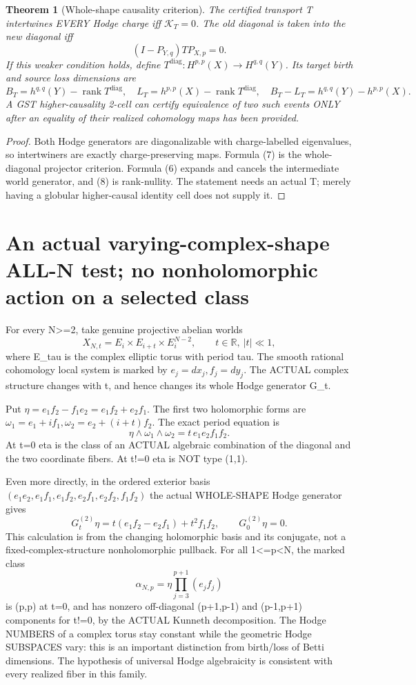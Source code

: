 \documentclass[11pt]{article}
\newtheorem{theorem}{Theorem}
\begin{document}
\begin{theorem}[Whole-shape causality criterion]
The certified transport T intertwines EVERY Hodge
charge iff \(\mathcal K_T=0\). The old diagonal is
taken into the new diagonal iff
\[
 \boxed{(I-P_{Y,q})T P_{X,p}=0.}                   \tag{7}
\]
If this weaker condition holds, define
\(T^{\mathrm{diag}}:H^{p,p}(X)\to H^{q,q}(Y)\).
Its target birth and source loss dimensions are
\[
 \boxed{
 B_T=h^{q,q}(Y)-\operatorname{rank}T^{\mathrm{diag}},
 \quad L_T=h^{p,p}(X)-\operatorname{rank}T^{\mathrm{diag}},
 \quad B_T-L_T=h^{q,q}(Y)-h^{p,p}(X).}             \tag{8}
\]
A GST higher-causality 2-cell can certify equivalence
of two such events ONLY after an equality of their
realized cohomology maps has been provided.
\end{theorem}
\begin{proof}
Both Hodge generators are diagonalizable with
charge-labelled eigenvalues, so intertwiners are
exactly charge-preserving maps. Formula (7)
is the whole-diagonal projector criterion.
Formula (6) expands and cancels the intermediate
world generator, and (8) is rank-nullity.
The statement needs an actual T; merely having a
globular higher-causal identity cell does not supply it.
\end{proof}

\section{An actual varying-complex-shape ALL-N test; no nonholomorphic action on a selected class}
For every N>=2, take genuine projective abelian worlds
\[
 X_{N,t}=E_i\times E_{i+t}\times E_i^{N-2},
 \qquad t\in\mathbb R,\ |t|\ll1,
\]
where E_tau is the complex elliptic torus with period tau.
The smooth rational cohomology local system is marked by
\(e_j=dx_j,f_j=dy_j\). The ACTUAL complex structure
changes with t, and hence changes its whole Hodge generator G_t.

Put \(\eta=e_1f_2-f_1e_2=e_1f_2+e_2f_1\).
The first two holomorphic forms are
\(\omega_1=e_1+if_1,\omega_2=e_2+(i+t)f_2\).
The exact period equation is
\[
 \boxed{\eta\wedge\omega_1\wedge\omega_2
        =t\,e_1e_2f_1f_2.}                       \tag{9}
\]
At t=0 eta is the class of an ACTUAL algebraic
combination of the diagonal and the two coordinate
fibers. At t!=0 eta is NOT type (1,1).

Even more directly, in the ordered exterior basis
\((e_1e_2,e_1f_1,e_1f_2,e_2f_1,e_2f_2,f_1f_2)\)
the actual WHOLE-SHAPE Hodge generator gives
\[
 \boxed{
 G_t^{(2)}\eta=t(e_1f_2-e_2f_1)+t^2f_1f_2,
 \qquad G_0^{(2)}\eta=0.}                        \tag{10}
\]
This calculation is from the changing holomorphic
basis and its conjugate, not a fixed-complex-structure
nonholomorphic pullback.
For all 1<=p<N, the marked class
\[
 \alpha_{N,p}=\eta\prod_{j=3}^{p+1}(e_jf_j)
\]
is (p,p) at t=0, and has nonzero off-diagonal
(p+1,p-1) and (p-1,p+1) components for t!=0,
by the ACTUAL Kunneth decomposition.
The Hodge NUMBERS of a complex torus stay constant
while the geometric Hodge SUBSPACES vary: this is an
important distinction from birth/loss of Betti dimensions.
The hypothesis of universal Hodge algebraicity is
consistent with every realized fiber in this family.
\end{document}

